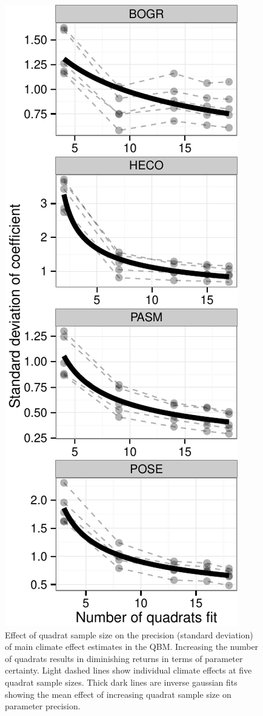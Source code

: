 \documentclass[12pt,]{article}
\begin{document}
\begin{figure}[htbp]
\centering
\includegraphics{components/figure/manuscript-figure_4.pdf}
\caption{Effect of quadrat sample size on the precision (standard
deviation) of main climate effect estimates in the QBM. Increasing the
number of quadrats results in diminishing returns in terms of parameter
certainty. Light dashed lines show individual climate effects at five
quadrat sample sizes. Thick dark lines are inverse gaussian fits showing
the mean effect of increasing quadrat sample size on parameter
precision.}
\end{figure}
\end{document}
